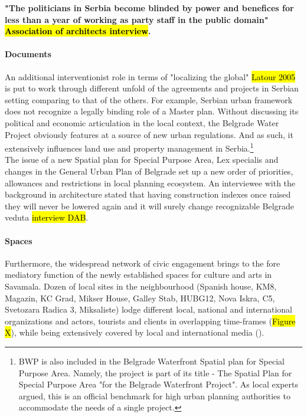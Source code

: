 \documentclass[11pt]{report}
\begin{document}
\textbf{"The politicians in Serbia become blinded by power and benefices for less than a year of working as party staff in the public domain" \hl{Association of architects interview}.}

\paragraph{Documents}

An additional interventionist role in terms of "localizing the global" \hl{Latour 2005} is put to work through different unfold of the agreements and projects in Serbian setting comparing to that of the others.
For example, Serbian urban framework does not recognize a legally binding role of a Master plan. Without discussing its political and economic articulation in the local context, the Belgrade Water Project obviously features at a source of new urban regulations.
And as such, it extensively influences land use and property management in Serbia.\footnote
{BWP is also included in the Belgrade Waterfront Spatial plan for Special Purpose Area.
Namely, the project is part of its title - The Spatial Plan for Special Purpose Area "for the Belgrade Waterfront Project". As local experts argued, this is an official benchmark for high urban planning authorities to accommodate the needs of a single project.}
\\
The issue of a new Spatial plan for Special Purpose Area, Lex specialis and changes in the General Urban Plan of Belgrade set up a new order of priorities, allowances and restrictions in local planning ecosystem. An interviewee with the background in architecture stated that having construction indexes once raised they will never be lowered again and it will surely change recognizable Belgrade veduta \hl{interview DAB}.

\paragraph{Spaces}

Furthermore, the widespread network of civic engagement brings to the fore mediatory function of the newly established spaces for culture and arts in Savamala.
Dozen of local sites in the neighbourhood
(Spanish house, KM8, Magazin, KC Grad, Mikser House, Galley Stab, HUBG12, Nova Iskra, C5, Svetozara Radica 3, Miksaliste) lodge different local, national and international organizations and actors, tourists and clients in overlapping time-frames (\hl{Figure X}),
while being extensively covered by local and international media
(\cite{add references from media sources archive}).
\end{document}
